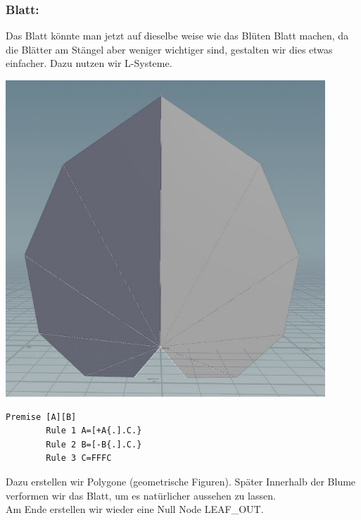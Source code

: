 \documentclass[paper=a4,fontsize=12pt,ngerman]{scrartcl}
\begin{document}
	\subsubsection*{Blatt:}
	Das Blatt könnte man jetzt auf dieselbe weise wie das Blüten Blatt machen, da die Blätter am Stängel aber weniger wichtiger sind, gestalten wir dies etwas einfacher. Dazu nutzen wir L-Systeme.\\
	\begin{minipage}{0.3\textwidth}
		\includegraphics[width=0.9\textwidth]{graphics/leaf1.JPG}
	\end{minipage}
	\begin{minipage}{0.7\textwidth}
		\begin{lstlisting}[basicstyle=\scriptsize]
		Premise [A][B]
		Rule 1 A=[+A{.].C.}
		Rule 2 B=[-B{.].C.}
		Rule 3 C=FFFC
	\end{lstlisting} 
	Dazu erstellen wir Polygone (geometrische Figuren). Später Innerhalb der Blume verformen wir das Blatt, um es natürlicher aussehen zu lassen.\\
	Am Ende erstellen wir wieder eine Null Node LEAF\_OUT.
	\end{minipage}
	
\end{document}
